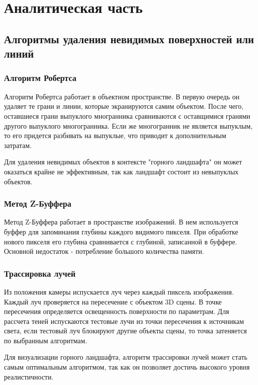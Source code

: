 



\chapter{Аналитическая часть}
\section{Алгоритмы удаления невидимых поверхностей или линий}
\subsection{Алгоритм Робертса}
Алгоритм Робертса работает в объектном пространстве. В первую очередь он удаляет те грани и линии, которые экранируются самим объектом. После чего, оставшиеся грани выпуклого многранника сравниваются с оставщимися гранями другого выпуклого многогранника. Если же многогранник не является выпуклым, то его придется разбивать на выпуклые, что приводит к дополнительным затратам. 

Для удаления невидимых объектов в контексте "горного ландшафта" он может оказаться крайне не эффективным, так как ландшафт состоит из невыпуклых объектов.

\subsection{Метод Z-Буффера} 
Метод Z-Буффера работает в пространстве изображений. В нем используется буффер для запоминания глубины каждого видимого пикселя. При обработке нового пикселя его глубина сравнивается с глубиной, записанной в буффере. Основной недостаток - потребление большого количества памяти. 

\subsection{Трассировка лучей}
Из положения камеры испускается луч через каждый пиксель изображения. Каждый луч проверяется на пересечение с объектом 3D сцены. В точке пересечения определяется освещенность поверхности по параметрам. Для рассчета теней испускаются тестовые лучи из точки пересечения к источникам света, если тестовый луч блокируют другие объекты сцены, то точка затеняется по выбранным алгоритмам. 

Для визуализации горного ландшафта, алгоритм трассировки лучей может стать самым оптимальным алгоритмом, так как он позволяет достичь высокого уровня реалистичности.


